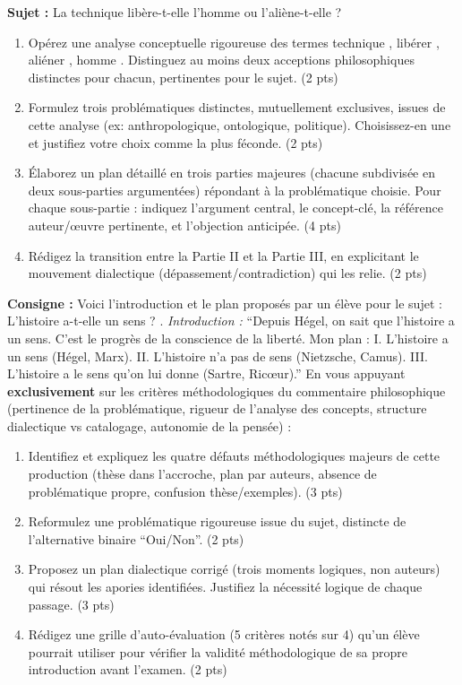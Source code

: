 \documentclass[11pt]{article}
\begin{document}
\begin{exercice}
\textbf{Sujet :} \og La technique libère-t-elle l'homme ou l'aliène-t-elle ? \fg{}
\begin{enumerate}
    \item Opérez une analyse conceptuelle rigoureuse des termes \og technique \fg{}, \og libérer \fg{}, \og aliéner \fg{}, \og homme \fg{}. Distinguez au moins deux acceptions philosophiques distinctes pour chacun, pertinentes pour le sujet. (2 pts)
    \item Formulez trois problématiques distinctes, mutuellement exclusives, issues de cette analyse (ex: anthropologique, ontologique, politique). Choisissez-en une et justifiez votre choix comme la plus féconde. (2 pts)
    \item Élaborez un plan détaillé en trois parties majeures (chacune subdivisée en deux sous-parties argumentées) répondant à la problématique choisie. Pour chaque sous-partie : indiquez l'argument central, le concept-clé, la référence auteur/œuvre pertinente, et l'objection anticipée. (4 pts)
    \item Rédigez la transition entre la Partie II et la Partie III, en explicitant le mouvement dialectique (dépassement/contradiction) qui les relie. (2 pts)
\end{enumerate}
\end{exercice}

\begin{exercice}
\textbf{Consigne :} Voici l'introduction et le plan proposés par un élève pour le sujet : \og L'histoire a-t-elle un sens ? \fg{}.
\medskip
\noindent \textit{Introduction :} ``Depuis Hégel, on sait que l'histoire a un sens. C'est le progrès de la conscience de la liberté. Mon plan : I. L'histoire a un sens (Hégel, Marx). II. L'histoire n'a pas de sens (Nietzsche, Camus). III. L'histoire a le sens qu'on lui donne (Sartre, Ricœur).''
\medskip
\noindent En vous appuyant \textbf{exclusivement} sur les critères méthodologiques du commentaire philosophique (pertinence de la problématique, rigueur de l'analyse des concepts, structure dialectique vs catalogage, autonomie de la pensée) :
\begin{enumerate}
    \item Identifiez et expliquez les quatre défauts méthodologiques majeurs de cette production (thèse dans l'accroche, plan par auteurs, absence de problématique propre, confusion thèse/exemples). (3 pts)
    \item Reformulez une problématique rigoureuse issue du sujet, distincte de l'alternative binaire ``Oui/Non''. (2 pts)
    \item Proposez un plan dialectique corrigé (trois moments logiques, non auteurs) qui résout les apories identifiées. Justifiez la nécessité logique de chaque passage. (3 pts)
    \item Rédigez une grille d'auto-évaluation (5 critères notés sur 4) qu'un élève pourrait utiliser pour vérifier la validité méthodologique de sa propre introduction avant l'examen. (2 pts)
\end{enumerate}
\end{exercice}
\end{document}
